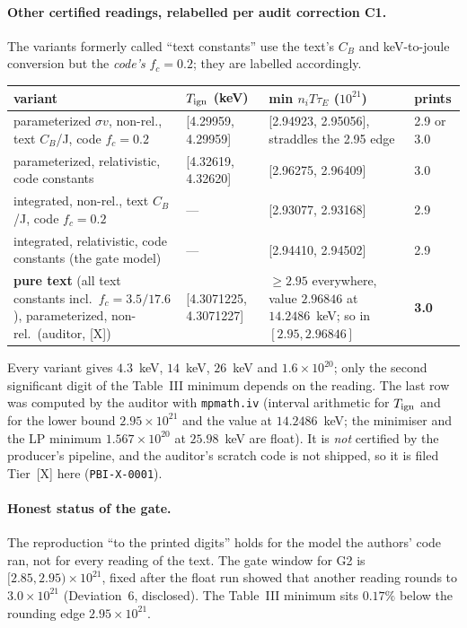 \documentclass[10pt]{article}
\newcommand{\tier}[1]{\textsf{[#1]}}
\newcommand{\tX}{\tier{X}}
\begin{document}
\paragraph{Other certified readings, relabelled per audit correction C1.} The variants formerly called ``text constants'' use the text's $C_B$ and keV-to-joule conversion but the \emph{code's} $f_c=0.2$; they are labelled accordingly.
\begin{center}\small\begin{tabular}{p{6.4cm}p{2.6cm}p{2.8cm}p{2.4cm}}\toprule
variant & $T_{\rm ign}$ (keV) & min $n_iT\tau_E$ ($10^{21}$) & prints\\\midrule
parameterized $\sigma v$, non-rel., text $C_B$/J, code $f_c=0.2$ & [4.29959, 4.29959] & [2.94923, 2.95056], straddles the 2.95 edge & 2.9 or 3.0\\
parameterized, relativistic, code constants & [4.32619, 4.32620] & [2.96275, 2.96409] & 3.0\\
integrated, non-rel., text $C_B$/J, code $f_c=0.2$ & --- & [2.93077, 2.93168] & 2.9\\
integrated, relativistic, code constants (the gate model) & --- & [2.94410, 2.94502] & 2.9\\
\textbf{pure text} (all text constants incl.\ $f_c=3.5/17.6$), parameterized, non-rel.\ (auditor, \tX{}) & [4.3071225, 4.3071227] & $\ge2.95$ everywhere, value $2.96846$ at $14.2486$~keV; so in $[2.95,2.96846]$ & \textbf{3.0}\\\bottomrule
\end{tabular}\end{center}
Every variant gives $4.3$~keV, $14$~keV, $26$~keV and $1.6\times10^{20}$; only the second significant digit of the Table~III minimum depends on the reading. The last row was computed by the auditor with \texttt{mpmath.iv} (interval arithmetic for $T_{\rm ign}$ and for the lower bound $2.95\times10^{21}$ and the value at $14.2486$~keV; the minimiser and the LP minimum $1.567\times10^{20}$ at $25.98$~keV are float). It is \emph{not} certified by the producer's pipeline, and the auditor's scratch code is not shipped, so it is filed Tier~\tX{} here (\texttt{PBI-X-0001}).

\paragraph{Honest status of the gate.} The reproduction ``to the printed digits'' holds for the model the authors' code ran, not for every reading of the text. The gate window for G2 is $[2.85,2.95)\times10^{21}$, fixed after the float run showed that another reading rounds to $3.0\times10^{21}$ (Deviation~6, disclosed). The Table~III minimum sits $0.17\%$ below the rounding edge $2.95\times10^{21}$.
\end{document}
